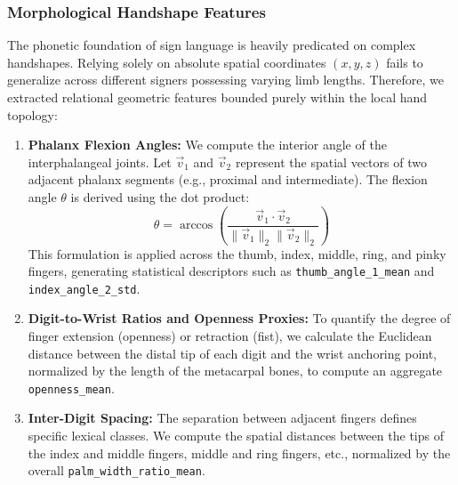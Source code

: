 \documentclass{ieeeaccess}
\DeclareRobustCommand{\textbf}[1]{{\bfseries #1}}
\begin{document}
\subsubsection{Morphological Handshape Features} 
The phonetic foundation of sign language is heavily predicated on complex handshapes. Relying solely on absolute spatial coordinates $(x,y,z)$ fails to generalize across different signers possessing varying limb lengths. Therefore, we extracted relational geometric features bounded purely within the local hand topology: 
\begin{enumerate} 
    \item \textbf{Phalanx Flexion Angles:} We compute the interior angle of the interphalangeal joints. Let $\vec{v}_1$ and $\vec{v}_2$ represent the spatial vectors of two adjacent phalanx segments (e.g., proximal and intermediate). The flexion angle $\theta$ is derived using the dot product: 
    \begin{equation} \label{eq:angle} 
    \theta = \arccos \left( \frac{\vec{v}_1 \cdot \vec{v}_2}{\lVert \vec{v}_1 \rVert_2 \lVert \vec{v}_2 \rVert_2} \right) 
    \end{equation} 
    This formulation is applied across the thumb, index, middle, ring, and pinky fingers, generating statistical descriptors such as \texttt{thumb\_angle\_1\_mean} and \texttt{index\_angle\_2\_std}. 
    \item \textbf{Digit-to-Wrist Ratios and Openness Proxies:} To quantify the degree of finger extension (openness) or retraction (fist), we calculate the Euclidean distance between the distal tip of each digit and the wrist anchoring point, normalized by the length of the metacarpal bones, to compute an aggregate \texttt{openness\_mean}.
    \item \textbf{Inter-Digit Spacing:} The separation between adjacent fingers defines specific lexical classes. We compute the spatial distances between the tips of the index and middle fingers, middle and ring fingers, etc., normalized by the overall \texttt{palm\_width\_ratio\_mean}. 
\end{enumerate}
\end{document}
